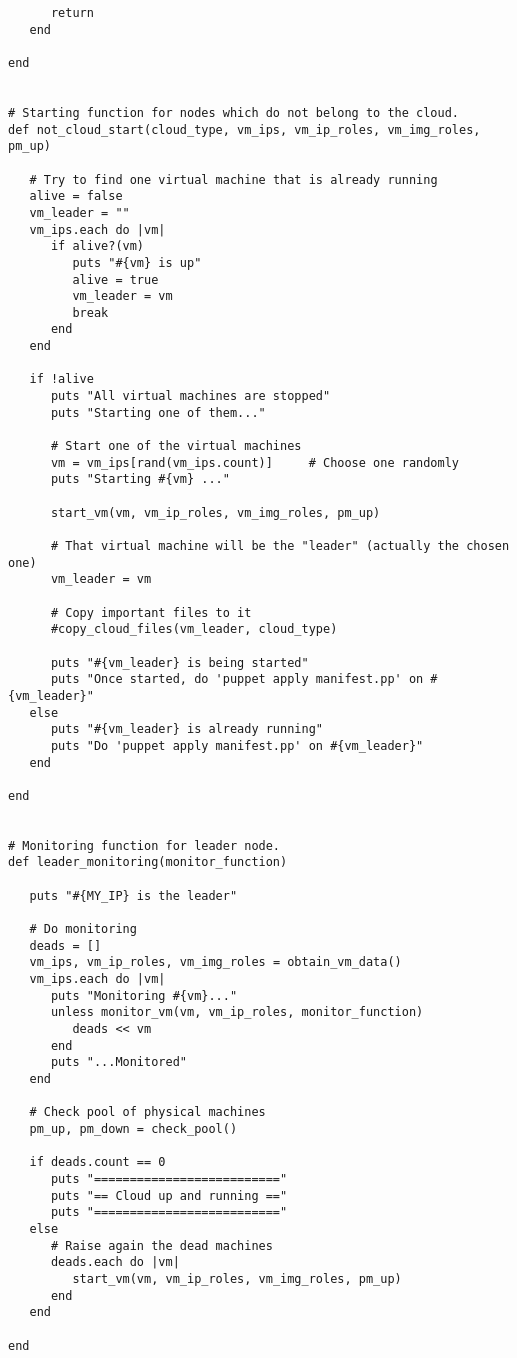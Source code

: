 \begin{lstlisting}
      return
   end

end


# Starting function for nodes which do not belong to the cloud.
def not_cloud_start(cloud_type, vm_ips, vm_ip_roles, vm_img_roles, pm_up)
   
   # Try to find one virtual machine that is already running
   alive = false
   vm_leader = ""
   vm_ips.each do |vm|
      if alive?(vm)
         puts "#{vm} is up"
         alive = true
         vm_leader = vm
         break
      end
   end
   
   if !alive
      puts "All virtual machines are stopped"
      puts "Starting one of them..."
   
      # Start one of the virtual machines
      vm = vm_ips[rand(vm_ips.count)]     # Choose one randomly
      puts "Starting #{vm} ..."
      
      start_vm(vm, vm_ip_roles, vm_img_roles, pm_up)
      
      # That virtual machine will be the "leader" (actually the chosen one)
      vm_leader = vm
      
      # Copy important files to it
      #copy_cloud_files(vm_leader, cloud_type)
      
      puts "#{vm_leader} is being started"
      puts "Once started, do 'puppet apply manifest.pp' on #{vm_leader}" 
   else
      puts "#{vm_leader} is already running"
      puts "Do 'puppet apply manifest.pp' on #{vm_leader}"
   end

end


# Monitoring function for leader node.
def leader_monitoring(monitor_function)

   puts "#{MY_IP} is the leader"
   
   # Do monitoring
   deads = []
   vm_ips, vm_ip_roles, vm_img_roles = obtain_vm_data()
   vm_ips.each do |vm|
      puts "Monitoring #{vm}..."
      unless monitor_vm(vm, vm_ip_roles, monitor_function)
         deads << vm
      end
      puts "...Monitored"
   end
   
   # Check pool of physical machines
   pm_up, pm_down = check_pool()
   
   if deads.count == 0
      puts "=========================="
      puts "== Cloud up and running =="
      puts "=========================="
   else
      # Raise again the dead machines
      deads.each do |vm|
         start_vm(vm, vm_ip_roles, vm_img_roles, pm_up)
      end
   end
            
end



\end{lstlisting}
